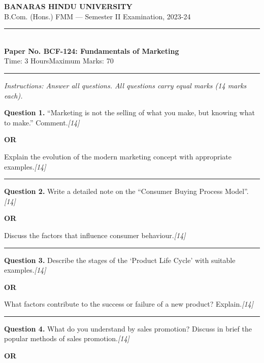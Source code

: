 \documentclass[11pt,a4paper]{article}
\newcommand{\pts}[1]{\hfill   \textit{[#1]}}
\begin{document}
\begin{center}
  {\large\bfseries BANARAS HINDU UNIVERSITY}\\[2pt]
  {\normalsize B.Com. (Hons.) FMM --- Semester II Examination, 2023-24}\\[6pt]
  \rule{0.8\linewidth}{0.5pt}\\[6pt]
  {\large\bfseries Paper No. BCF-124: Fundamentals of Marketing}\\[4pt]
  {\normalsize Time: 3 Hours\hfill Maximum Marks: 70}
\end{center}

\rule{\linewidth}{0.4pt}

\smallskip



\noindent   \textit{Instructions: Answer all questions. All questions carry equal marks (14 marks each).}

\bigskip




\noindent   \textbf{Question 1.}
``Marketing is not the selling of what you make, but knowing what to make.'' Comment.\pts{14}

\centerline{   \textbf{OR}}

Explain the evolution of the modern marketing concept with appropriate examples.\pts{14}

\medskip\rule{\linewidth}{0.2pt}




\noindent   \textbf{Question 2.}
Write a detailed note on the ``Consumer Buying Process Model''.\pts{14}

\centerline{   \textbf{OR}}

Discuss the factors that influence consumer behaviour.\pts{14}

\medskip\rule{\linewidth}{0.2pt}




\noindent   \textbf{Question 3.}
Describe the stages of the `Product Life Cycle' with suitable examples.\pts{14}

\centerline{   \textbf{OR}}

What factors contribute to the success or failure of a new product? Explain.\pts{14}

\medskip\rule{\linewidth}{0.2pt}




\noindent   \textbf{Question 4.}
What do you understand by sales promotion? Discuss in brief the popular methods of sales promotion.\pts{14}

\centerline{   \textbf{OR}}
\end{document}
